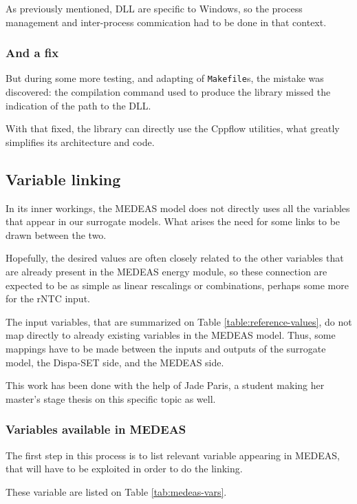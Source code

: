 As previously mentioned, DLL are specific to Windows, so the process management and inter-process commication had to be done in that context.

\subsubsection{And a fix}

But during some more testing, and adapting of \texttt{Makefile}s, the mistake was discovered: the compilation command used to produce the library missed the indication of the path to the DLL.

With that fixed, the library can directly use the Cppflow utilities, what greatly simplifies its architecture and code.

\subsection{Variable linking}

In its inner workings, the MEDEAS model does not directly uses all the variables that appear in our surrogate models. What arises the need for some links to be drawn between the two.

Hopefully, the desired values are often closely related to the other variables that are already present in the MEDEAS energy module, so these connection are expected to be as simple as linear rescalings or combinations, perhaps some more for the rNTC input.

The input variables, that are summarized on Table \ref{table:reference-values}, do not map directly to already existing variables in the MEDEAS model. Thus, some mappings have to be made between the inputs and outputs of the surrogate model, the Dispa-SET side, and the MEDEAS side.

This work has been done with the help of Jade Paris, a student making her master's stage thesis on this specific topic as well.

\subsubsection{Variables available in MEDEAS}

The first step in this process is to list relevant variable appearing in MEDEAS, that will have to be exploited in order to do the linking.

These variable are listed on Table \ref{tab:medeas-vars}.


